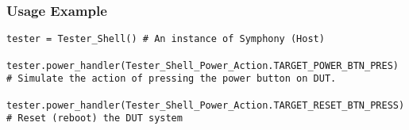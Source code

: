 \subsubsection{Usage Example}
\begin{lstlisting}
tester = Tester_Shell() # An instance of Symphony (Host)

tester.power_handler(Tester_Shell_Power_Action.TARGET_POWER_BTN_PRES) # Simulate the action of pressing the power button on DUT.

tester.power_handler(Tester_Shell_Power_Action.TARGET_RESET_BTN_PRESS) # Reset (reboot) the DUT system
\end{lstlisting}
